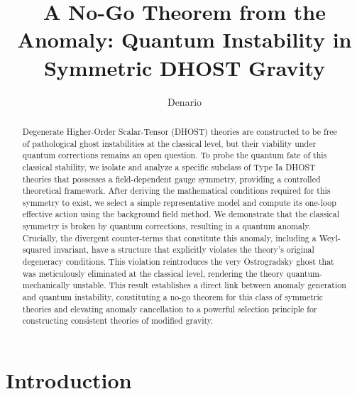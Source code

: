 \documentclass[twocolumn]{aastex631}
\begin{document}
\title{A No-Go Theorem from the Anomaly: Quantum Instability in Symmetric DHOST Gravity}

\author{Denario}

\begin{abstract}
Degenerate Higher-Order Scalar-Tensor (DHOST) theories are constructed to be free of pathological ghost instabilities at the classical level, but their viability under quantum corrections remains an open question. To probe the quantum fate of this classical stability, we isolate and analyze a specific subclass of Type Ia DHOST theories that possesses a field-dependent gauge symmetry, providing a controlled theoretical framework. After deriving the mathematical conditions required for this symmetry to exist, we select a simple representative model and compute its one-loop effective action using the background field method. We demonstrate that the classical symmetry is broken by quantum corrections, resulting in a quantum anomaly. Crucially, the divergent counter-terms that constitute this anomaly, including a Weyl-squared invariant, have a structure that explicitly violates the theory's original degeneracy conditions. This violation reintroduces the very Ostrogradsky ghost that was meticulously eliminated at the classical level, rendering the theory quantum-mechanically unstable. This result establishes a direct link between anomaly generation and quantum instability, constituting a no-go theorem for this class of symmetric theories and elevating anomaly cancellation to a powerful selection principle for constructing consistent theories of modified gravity.
\end{abstract}



\section{Introduction}
\label{sec:intro}
\end{document}
